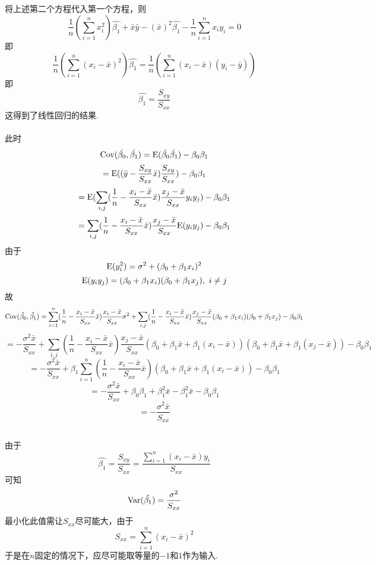 \documentclass{article}
\begin{document}
\begin{CJK}{UTF8}{gbsn}
\subsection{}
将上述第二个方程代入第一个方程，则
$$ \frac{1}{n}(\sum\limits_{i=1}^{n}x_{i}^{2})\hat{\beta_{1}}+\bar{x}\bar{y}-(\bar{x})^{2}\hat{\beta_{1}}-\frac{1}{n}\sum\limits_{i=1}^{n}x_{i}y_{i}=0$$
即
$$ \frac{1}{n}(\sum\limits_{i=1}^{n}(x_{i}-\bar{x})^{2})\hat{\beta_{1}}=\frac{1}{n}(\sum\limits_{i=1}^{n}(x_{i}-\bar{x})(y_{i}-\bar{y}))$$
即
$$ \hat{\beta_{1}}=\frac{S_{xy}}{S_{xx}}$$
这得到了线性回归的结果.
\\\\此时
$$ {\rm Cov}(\hat{\beta_{0}},\hat{\beta_{1}})={\rm E}(\hat{\beta_{0}}\hat{\beta_{1}})-\beta_{0}\beta_{1}$$
$$ ={\rm E}((\bar{y}-\frac{S_{xy}}{S_{xx}}\bar{x})\frac{S_{xy}}{S_{xx}})-\beta_{0}\beta_{1} $$
$$ ={\rm E}(\sum\limits_{i,j}(\frac{1}{n}-\frac{x_{i}-\bar{x}}{S_{xx}}\bar{x})\frac{x_{j}-\bar{x}}{S_{xx}}y_{i}y_{j})-\beta_{0}\beta_{1} $$
$$ =\sum\limits_{i,j}(\frac{1}{n}-\frac{x_{i}-\bar{x}}{S_{xx}}\bar{x})\frac{x_{j}-\bar{x}}{S_{xx}}{\rm E}(y_{i}y_{j})-\beta_{0}\beta_{1} $$
由于
$$ {\rm E}(y_{i}^{2})=\sigma^{2}+(\beta_{0}+\beta_{1}x_{i})^{2} $$
$$ {\rm E}(y_{i}y_{j})=(\beta_{0}+\beta_{1}x_{i})(\beta_{0}+\beta_{1}x_{j}),\ i\neq j $$
故
$$ {\rm Cov}(\hat{\beta_{0}},\hat{\beta_{1}})=\sum\limits_{i=1}^{n}(\frac{1}{n}-\frac{x_{i}-\bar{x}}{S_{xx}}\bar{x})\frac{x_{i}-\bar{x}}{S_{xx}}\sigma^{2}+\sum\limits_{i,j}(\frac{1}{n}-\frac{x_{i}-\bar{x}}{S_{xx}}\bar{x})\frac{x_{j}-\bar{x}}{S_{xx}}(\beta_{0}+\beta_{1}x_{i})(\beta_{0}+\beta_{1}x_{j})-\beta_{0}\beta_{1} $$
$$ =-\frac{\sigma^{2}\bar{x}}{S_{xx}}+\sum\limits_{i,j}(\frac{1}{n}-\frac{x_{i}-\bar{x}}{S_{xx}}\bar{x})\frac{x_{j}-\bar{x}}{S_{xx}}(\beta_{0}+\beta_{1}\bar{x}+\beta_{1}(x_{i}-\bar{x}))(\beta_{0}+\beta_{1}\bar{x}+\beta_{1}(x_{j}-\bar{x}))-\beta_{0}\beta_{1} $$
$$ =-\frac{\sigma^{2}\bar{x}}{S_{xx}}+\beta_{1}\sum\limits_{i=1}^{n}(\frac{1}{n}-\frac{x_{i}-\bar{x}}{S_{xx}}\bar{x})(\beta_{0}+\beta_{1}\bar{x}+\beta_{1}(x_{i}-\bar{x}))-\beta_{0}\beta_{1} $$
$$ =-\frac{\sigma^{2}\bar{x}}{S_{xx}}+\beta_{0}\beta_{1}+\beta_{1}^{2}\bar{x}-\beta_{1}^{2}\bar{x}-\beta_{0}\beta_{1} $$
$$ =-\frac{\sigma^{2}\bar{x}}{S_{xx}} $$
\subsection{}
由于
$$ \hat{\beta_{1}}=\frac{S_{xy}}{S_{xx}}=\frac{\sum\limits_{i=1}^{n}(x_{i}-\bar{x})y_{i}}{S_{xx}} $$
可知
$$ {\rm Var}(\hat{\beta_{1}})=\frac{\sigma^{2}}{S_{xx}} $$
最小化此值需让$S_{xx}$尽可能大，由于
$$ S_{xx} = \sum\limits_{i=1}^{n}(x_{i}-\bar{x})^{2}$$
于是在$n$固定的情况下，应尽可能取等量的$-1$和$1$作为输入.

\end{CJK}
\end{document}
